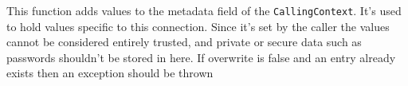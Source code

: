 This function adds values to the metadata field of the \verb+CallingContext+. It's used to hold values specific to this connection. 
Since it's set by the caller the values cannot be considered entirely trusted, and private or secure data such as passwords shouldn't be stored in here.
If overwrite is false and an entry already exists then an exception should be thrown
